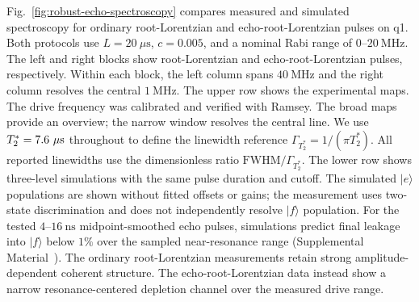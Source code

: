 Fig.~\ref{fig:robust-echo-spectroscopy} compares measured and simulated
spectroscopy for ordinary root-Lorentzian and echo-root-Lorentzian pulses
on q1. Both protocols use $L=20~\mu\mathrm{s}$, $c=0.005$, and
a nominal Rabi range of $0$--$20~\mathrm{MHz}$.
The left and right blocks show root-Lorentzian and echo-root-Lorentzian
pulses, respectively. Within each block, the left column spans
$40~\mathrm{MHz}$ and the right column resolves the central
$1~\mathrm{MHz}$. The upper row shows
the experimental maps. The drive frequency was calibrated and verified
with Ramsey. The broad maps provide an overview;
the narrow window resolves the central line. We use
$T_2^*=7.6~\mu\mathrm{s}$ throughout to define the linewidth reference
$\Gamma_{T_2^*}=1/(\pi T_2^*)$. All reported linewidths use the
dimensionless ratio $\mathrm{FWHM}/\Gamma_{T_2^*}$.
The lower row shows three-level simulations with the same
pulse duration and cutoff. The simulated $|e\rangle$ populations are shown
without fitted offsets or gains; the measurement uses two-state discrimination
and does not independently resolve $|f\rangle$ population.
For the tested $4$--$16~\mathrm{ns}$ midpoint-smoothed echo pulses,
simulations predict final leakage into $|f\rangle$ below $1\%$ over the
sampled near-resonance range (Supplemental Material~\cite{SupplementalMaterial}).
The ordinary root-Lorentzian measurements retain strong amplitude-dependent
coherent structure. The
echo-root-Lorentzian data instead show a narrow resonance-centered depletion
channel over the measured drive range.



